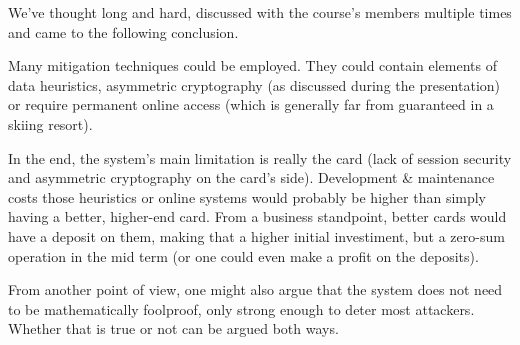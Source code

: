 \documentclass[paper=a4, fontsize=11pt]{scrartcl}
\begin{document}
We've thought long and hard, discussed with the course's members multiple times
and came to the following conclusion.

Many mitigation techniques could be employed.
They could contain elements of data heuristics, asymmetric cryptography (as
discussed during the presentation) or require permanent online access (which
is generally far from guaranteed in a skiing resort).

In the end, the system's main limitation is really the card (lack of session
security and asymmetric cryptography on the card's side).
Development \& maintenance costs those heuristics or online systems
would probably be higher than simply having a better, higher-end card.
From a business standpoint, better cards would have a deposit on them, making
that a higher initial investiment, but a zero-sum operation in the mid term (or
one could even make a profit on the deposits).

From another point of view, one might also argue that the system does not need
to be mathematically foolproof, only strong enough to deter most attackers.
Whether that is true or not can be argued both ways.
\end{document}
